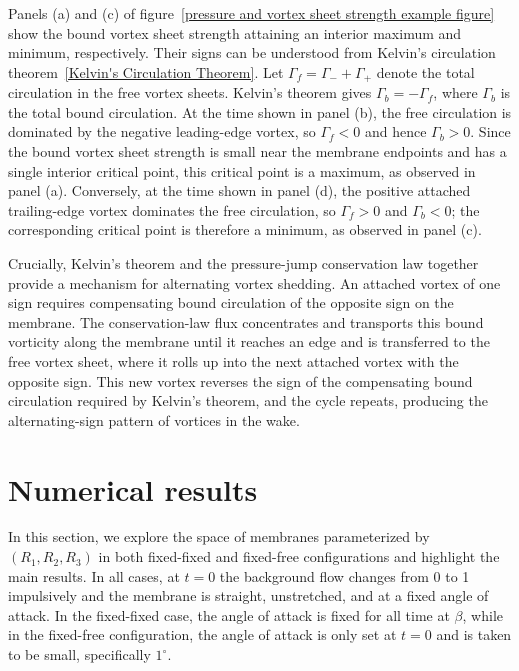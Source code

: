 \documentclass{article}[12pt]
\theoremstyle{Theorem}
\begin{document}
Panels (a) and (c) of figure~\ref{pressure and vortex sheet strength example figure} show the bound vortex sheet strength attaining an interior maximum and minimum, respectively. Their signs can be understood from Kelvin's circulation theorem~\eqref{Kelvin's Circulation Theorem}. Let \(\Gamma_f=\Gamma_-+\Gamma_+\) denote the total circulation in the free vortex sheets. Kelvin's theorem gives \(\Gamma_b=-\Gamma_f\), where \(\Gamma_b\) is the total bound circulation. At the time shown in panel (b), the free circulation is dominated by the negative leading-edge vortex, so \(\Gamma_f<0\) and hence \(\Gamma_b>0\). Since the bound vortex sheet strength is small near the membrane endpoints and has a single interior critical point, this critical point is a maximum, as observed in panel (a). Conversely, at the time shown in panel (d), the positive attached trailing-edge vortex dominates the free circulation, so \(\Gamma_f>0\) and \(\Gamma_b<0\); the corresponding critical point is therefore a minimum, as observed in panel (c).
\newline

Crucially, Kelvin's theorem and the pressure-jump conservation law together provide a mechanism for alternating vortex shedding. An attached vortex of one sign requires compensating bound circulation of the opposite sign on the membrane. The conservation-law flux concentrates and transports this bound vorticity along the membrane until it reaches an edge and is transferred to the free vortex sheet, where it rolls up into the next attached vortex with the opposite sign. This new vortex reverses the sign of the compensating bound circulation required by Kelvin's theorem, and the cycle repeats, producing the alternating-sign pattern of vortices in the wake.

\section{Numerical results}
\label{numerical results section}
In this section, we explore the space of membranes parameterized by $(R_1,R_2,R_3)$ in both fixed-fixed and fixed-free configurations and highlight the main results. In all cases, at $t = 0$ the background flow changes from 0 to 1 impulsively and the membrane is straight, unstretched, and at a fixed angle of attack. In the fixed-fixed case, the angle of attack is fixed for all time at $\beta$, while in the fixed-free configuration, the angle of attack is only set at $t = 0$ and is taken to be small, specifically $1^\circ$.
\end{document}
